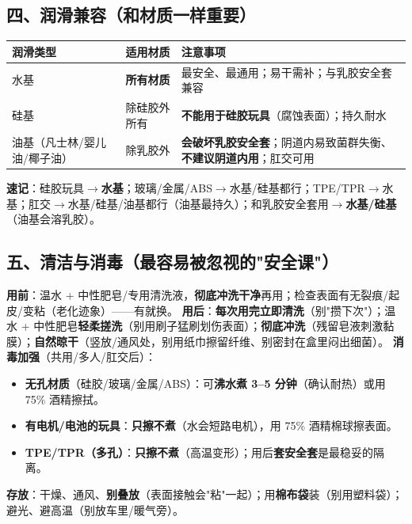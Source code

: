 \documentclass[12pt,UTF8,openany]{ctexbook}
\begin{document}
\subsection*{四、润滑兼容（和材质一样重要）}
\begin{tabularx}{\textwidth}{X X X}
\toprule
\textbf{润滑类型} & \textbf{适用材质} & \textbf{注意事项} \\
\midrule
水基 & \textbf{所有材质} & 最安全、最通用；易干需补；与乳胶安全套兼容 \\
硅基 & 除硅胶外所有 & \textbf{不能用于硅胶玩具}（腐蚀表面）；持久耐水 \\
油基（凡士林/婴儿油/椰子油） & 除乳胶外 & \textbf{会破坏乳胶安全套}；阴道内易致菌群失衡、\textbf{不建议阴道内用}；肛交可用 \\
\bottomrule
\end{tabularx}
\par\smallskip
\textbf{速记}：硅胶玩具$\to$\textbf{水基}；玻璃/金属/ABS$\to$水基/硅基都行；TPE/TPR$\to$水基；肛交$\to$水基/硅基/油基都行（油基最持久）；和乳胶安全套用$\to$\textbf{水基/硅基}（油基会溶乳胶）。

\subsection*{五、清洁与消毒（最容易被忽视的"安全课"）}
\textbf{用前}：温水 + 中性肥皂/专用清洗液，\textbf{彻底冲洗干净}再用；检查表面有无裂痕/起皮/变粘（老化迹象）——有就换。
\textbf{用后}：\textbf{每次用完立即清洗}（别"攒下次"）；温水 + 中性肥皂\textbf{轻柔搓洗}（别用刷子猛刷划伤表面）；\textbf{彻底冲洗}（残留皂液刺激黏膜）；\textbf{自然晾干}（竖放/通风处，别用纸巾擦留纤维、别密封在盒里闷出细菌）。
\textbf{消毒加强}（共用/多人/肛交后）：
\begin{itemize}[leftmargin=2em,itemsep=0.2em]
  \item \textbf{无孔材质}（硅胶/玻璃/金属/ABS）：可\textbf{沸水煮 3--5 分钟}（确认耐热）或用 75\% 酒精擦拭。
  \item \textbf{有电机/电池的玩具}：\textbf{只擦不煮}（水会短路电机），用 75\% 酒精棉球擦表面。
  \item \textbf{TPE/TPR（多孔）}：\textbf{只擦不煮}（高温变形）；用后\textbf{套安全套}是最稳妥的隔离。
\end{itemize}
\textbf{存放}：干燥、通风、\textbf{别叠放}（表面接触会"粘"一起）；用\textbf{棉布袋}装（别用塑料袋）；避光、避高温（别放车里/暖气旁）。
\end{document}
